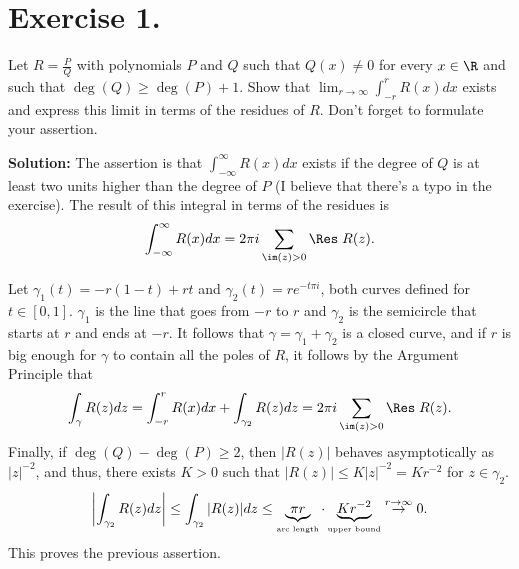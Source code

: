 \section*{Exercise 1.}

Let $R = \frac{P}{Q}$ with polynomials $P$ and $Q$ such that $Q(x) \neq 0$ for every $x \in \R$ and such that $\deg(Q) \geq \deg(P)+1$. Show that $\displaystyle \lim_{r\to\infty} \int_{-r}^r R(x) dx$ exists and express this limit in terms of the residues of $R$. Don't forget to formulate your assertion.

\textbf{Solution:} The assertion is that $\int_{-\infty}^\infty R(x) dx$ exists if the degree of $Q$ is at least two units higher than the degree of $P$ (I believe that there's a typo in the exercise). The result of this integral in terms of the residues is
\[ \int_{-\infty}^\infty R(x) dx = 2\pi i \sum_{\im(z) > 0} \Res\; R(z). \]

Let $\gamma_1(t) = -r(1-t) + rt$ and $\gamma_2(t) = re^{-t\pi i}$, both curves defined for $t \in [0,1]$. $\gamma_1$ is the line that goes from $-r$ to $r$ and $\gamma_2$ is the semicircle that starts at $r$ and ends at $-r$. It follows that $\gamma = \gamma_1+\gamma_2$ is a closed curve, and if $r$ is big enough for $\gamma$ to contain all the poles of $R$, it follows by the Argument Principle that
\[ \int_{\gamma} R(z) dz = \int_{-r}^r R(x) dx + \int_{\gamma_2} R(z) dz = 2\pi i \sum_{\im(z) > 0} \Res\; R(z). \]
Finally, if $\deg(Q) - \deg(P) \geq 2$, then $|R(z)|$ behaves asymptotically as $|z|^{-2}$, and thus, there exists $K > 0$ such that $|R(z)| \leq K |z|^{-2} = K r^{-2}$ for $z \in \gamma_2$.
\[ \left| \int_{\gamma_2} R(z) dz \right| \leq \int_{\gamma_2} |R(z)| dz \leq \underbrace{\pi r}_{\mbox{\tiny{arc length}}} \cdot \underbrace{K r^{-2}}_{\mbox{\tiny{upper bound}}} \overset{r\to\infty}{\to} 0. \]
This proves the previous assertion.
